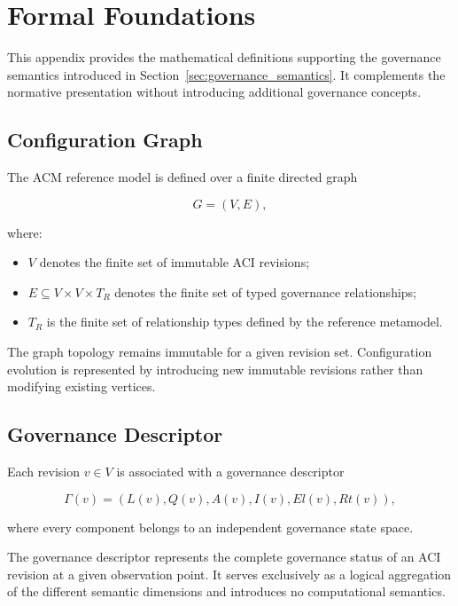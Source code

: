 \documentclass[10pt]{article}
\begin{document}
\section{Formal Foundations}
\label{appendix:formal_foundations}

This appendix provides the mathematical definitions supporting the governance semantics introduced in Section~\ref{sec:governance_semantics}. It complements the normative presentation without introducing additional governance concepts.

\subsection{Configuration Graph}

The ACM reference model is defined over a finite directed graph

\begin{equation}
	G=(V,E),
	\label{eq:graph_definition}
\end{equation}

where:

\begin{itemize}
	\item $V$ denotes the finite set of immutable ACI revisions;
	\item $E\subseteq V\times V\times T_R$ denotes the finite set of typed governance relationships;
	\item $T_R$ is the finite set of relationship types defined by the reference metamodel.
\end{itemize}

The graph topology remains immutable for a given revision set. Configuration evolution is represented by introducing new immutable revisions rather than modifying existing vertices.

\subsection{Governance Descriptor}

Each revision $v\in V$ is associated with a governance descriptor

\begin{equation}
	\Gamma(v)=
	\left(
	L(v),
	Q(v),
	A(v),
	I(v),
	El(v),
	Rt(v)
	\right),
	\label{eq:descriptor_definition}
\end{equation}

where every component belongs to an independent governance state space.

The governance descriptor represents the complete governance status of an ACI revision at a given observation point. It serves exclusively as a logical aggregation of the different semantic dimensions and introduces no computational semantics.
\end{document}
